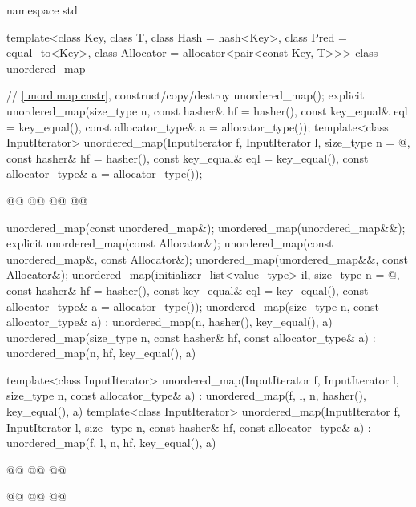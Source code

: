 \documentclass{wg21}
\begin{document}
%
\begin{codeblock}
namespace std {
template<class Key,
class T,
class Hash = hash<Key>,
class Pred = equal_to<Key>,
class Allocator = allocator<pair<const Key, T>>>
class unordered_map {
    // \ref{unord.map.cnstr}, construct/copy/destroy
    unordered_map();
    explicit unordered_map(size_type n, const hasher& hf = hasher(), 
        const key_equal& eql = key_equal(), const allocator_type& a = allocator_type());
    template<class InputIterator>
    unordered_map(InputIterator f, InputIterator l, size_type n = @\seebelow@, 
        const hasher& hf = hasher(), const key_equal& eql = key_equal(),
        const allocator_type& a = allocator_type());
    
    @@
    @@
    @@
    @@
    
    unordered_map(const unordered_map&);
    unordered_map(unordered_map&&);
    explicit unordered_map(const Allocator&);
    unordered_map(const unordered_map&, const Allocator&);
    unordered_map(unordered_map&&, const Allocator&);
    unordered_map(initializer_list<value_type> il, size_type n = @\seebelow@,
        const hasher& hf = hasher(),
        const key_equal& eql = key_equal(),
        const allocator_type& a = allocator_type());
    unordered_map(size_type n, const allocator_type& a)
    : unordered_map(n, hasher(), key_equal(), a) { }
    unordered_map(size_type n, const hasher& hf, const allocator_type& a)
    : unordered_map(n, hf, key_equal(), a) { }
    
    template<class InputIterator>
    unordered_map(InputIterator f, InputIterator l, size_type n, const allocator_type& a)
    : unordered_map(f, l, n, hasher(), key_equal(), a) { }
    template<class InputIterator>
    unordered_map(InputIterator f, InputIterator l, size_type n, const hasher& hf,
    const allocator_type& a)
    : unordered_map(f, l, n, hf, key_equal(), a) { }
    
    @@
    @@
    @@
    
    @@
    @@
    @@
    
}}
\end{codeblock}
\end{document}
